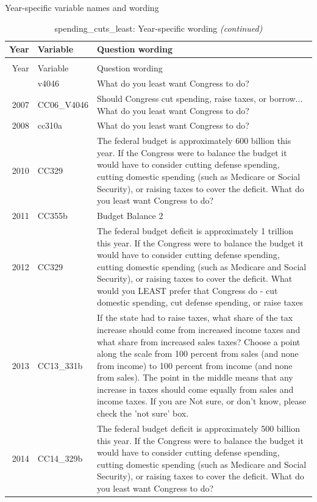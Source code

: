 \documentclass[12pt]{article}
\begin{document}
Year-specific variable names and wording

\begin{longtable}[t]{rl>{\raggedright\arraybackslash}p{10cm}}
\caption{\label{tab:unnamed-chunk-4}spending\_cuts\_least: Year-specific wording}\\
\toprule
Year & Variable & Question wording\\
\midrule
\endfirsthead
\caption[]{spending\_cuts\_least: Year-specific wording \textit{(continued)}}\\
\toprule
Year & Variable & Question wording\\
\midrule
\endhead
\
\endfoot
\bottomrule
\endlastfoot
2006 & v4046 & What do you least want Congress to do?\\
2007 & CC06\_V4046 & Should Congress cut spending, raise taxes, or borrow... What do you least want Congress to do?\\
2008 & cc310a & What do you least want Congress to do?\\
2010 & CC329 & The federal budget is approximately 600 billion this year. If the Congress were to balance the budget it would have to consider cutting defense spending, cutting domestic spending (such as Medicare or Social Security), or raising taxes to cover the deficit. What do you least want Congress to do?\\
2011 & CC355b & Budget Balance 2\\
2012 & CC329 & The federal budget deficit is approximately 1 trillion this year. If the Congress were to balance the budget it would have to consider cutting defense spending, cutting domestic spending (such as Medicare and Social Security), or raising taxes to cover the deficit. What would you LEAST prefer that Congress do - cut domestic spending, cut defense spending, or raise taxes\\
2013 & CC13\_331b & If the state had to raise taxes, what share of the tax increase should come from increased income taxes and what share from increased sales taxes? Choose a point along the scale from 100 percent from sales (and none from income) to 100 percent from income (and none from sales). The point in the middle means that any increase in taxes should come equally from sales and income taxes. If you are Not sure, or don't know, please check the 'not sure' box.\\
2014 & CC14\_329b & The federal budget deficit is approximately 500 billion this year. If the Congress were to balance the budget it would have to consider cutting defense spending, cutting domestic spending (such as Medicare and Social Security), or raising taxes to cover the deficit. What do you least want Congress to do?\\

\end{longtable}
\end{document}
